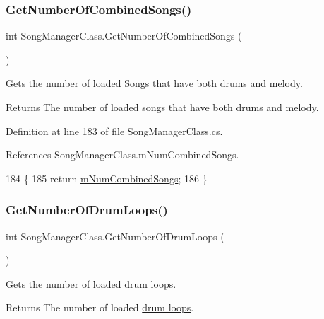 \subsubsection{\texorpdfstring{Get\+Number\+Of\+Combined\+Songs()}{GetNumberOfCombinedSongs()}}
{\footnotesize\ttfamily int Song\+Manager\+Class.\+Get\+Number\+Of\+Combined\+Songs (\begin{DoxyParamCaption}{ }\end{DoxyParamCaption})}



Gets the number of loaded Songs that \hyperlink{group___song_group_DocSongCombined}{have both drums and melody}. 

\begin{DoxyReturn}{Returns}
The number of loaded songs that \hyperlink{group___song_group_DocSongCombined}{have both drums and melody}. 
\end{DoxyReturn}


Definition at line 183 of file Song\+Manager\+Class.\+cs.



References Song\+Manager\+Class.\+m\+Num\+Combined\+Songs.


\begin{DoxyCode}
184     \{
185         \textcolor{keywordflow}{return} \hyperlink{group___s_m_priv_var_gae423c7b9efd0e2ef721820318200e5f9}{mNumCombinedSongs};
186     \}
\end{DoxyCode}
\mbox{\label{group___s_m_pub_func_ga97d32492e08ca62787088888e78589b7}} 
\subsubsection{\texorpdfstring{Get\+Number\+Of\+Drum\+Loops()}{GetNumberOfDrumLoops()}}
{\footnotesize\ttfamily int Song\+Manager\+Class.\+Get\+Number\+Of\+Drum\+Loops (\begin{DoxyParamCaption}{ }\end{DoxyParamCaption})}



Gets the number of loaded \hyperlink{group___song_group_DocSongDrumLoop}{drum loops}. 

\begin{DoxyReturn}{Returns}
The number of loaded \hyperlink{group___song_group_DocSongDrumLoop}{drum loops}. 
\end{DoxyReturn}


